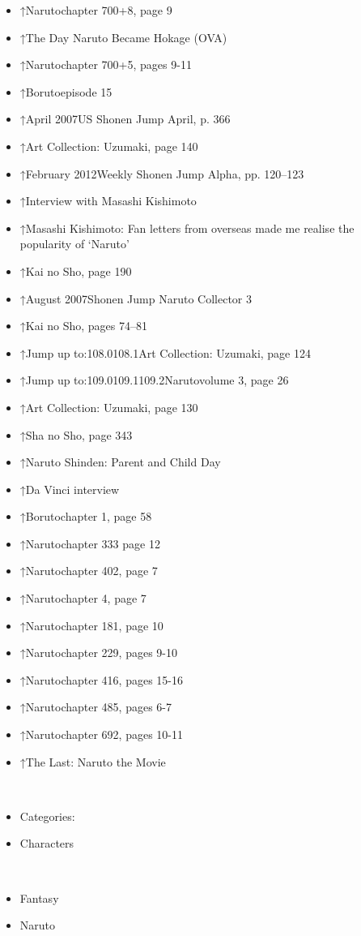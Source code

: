 \documentclass[a4paper,12pt]{article}
\begin{document}
\begin{itemize}
\item ↑Narutochapter 700+8, page 9
\item ↑The Day Naruto Became Hokage (OVA)
\item ↑Narutochapter 700+5, pages 9-11
\item ↑Borutoepisode 15
\item ↑April 2007US Shonen Jump April, p. 366
\item ↑Art Collection: Uzumaki, page 140
\item ↑February 2012Weekly Shonen Jump Alpha, pp. 120–123
\item ↑Interview with Masashi Kishimoto
\item ↑Masashi Kishimoto: Fan letters from overseas made me realise the popularity of ‘Naruto’
\item ↑Kai no Sho, page 190
\item ↑August 2007Shonen Jump Naruto Collector 3
\item ↑Kai no Sho, pages 74–81
\item ↑Jump up to:108.0108.1Art Collection: Uzumaki, page 124
\item ↑Jump up to:109.0109.1109.2Narutovolume 3, page 26
\item ↑Art Collection: Uzumaki, page 130
\item ↑Sha no Sho, page 343
\item ↑Naruto Shinden: Parent and Child Day
\item ↑Da Vinci interview
\item ↑Borutochapter 1, page 58
\item ↑Narutochapter 333 page 12
\item ↑Narutochapter 402, page 7
\item ↑Narutochapter 4, page 7
\item ↑Narutochapter 181, page 10
\item ↑Narutochapter 229, pages 9-10
\item ↑Narutochapter 416, pages 15-16
\item ↑Narutochapter 485, pages 6-7
\item ↑Narutochapter 692, pages 10-11
\item ↑The Last: Naruto the Movie
\end{itemize}\\ \par \vspace{0.5cm}

\begin{itemize}
\item Categories:
\item Characters
\end{itemize}\\ \par \vspace{0.5cm}

\begin{itemize}
\item Fantasy
\item Naruto
\end{itemize}\\ \par \vspace{0.5cm}
\end{document}
